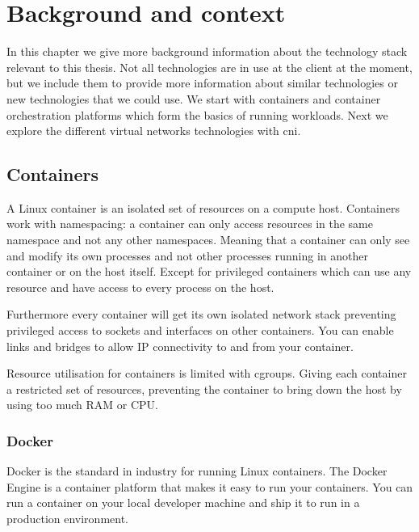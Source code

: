 \chapter{Background and context}
\label{chap:background}

In this chapter we give more background information about the technology stack relevant to this thesis. Not all technologies are in use at the client at the moment, but we include them to provide more information about similar technologies or new technologies that we could use. We start with containers and container orchestration platforms which form the basics of running workloads. Next we explore the different virtual networks technologies with \gls{cni}.

\section{Containers}
\label{sec:containers}
A Linux container is an isolated set of resources on a compute host. Containers work with namespacing: a container can only access resources in the same namespace and not any other namespaces. Meaning that a container can only see and modify its own processes and not other processes running in another container or on the host itself. Except for privileged containers which can use any resource and have access to every process on the host. 

Furthermore every container will get its own isolated network stack preventing privileged access to sockets and interfaces on other containers. You can enable links and bridges to allow IP connectivity to and from your container.

Resource utilisation for containers is limited with \glspl{cgroup}. Giving each container a restricted set of resources, preventing the container to bring down the host by using too much RAM or CPU\cite{docker_security}.

\subsection{Docker}
\label{subsec:docker}
Docker is the standard in industry for running Linux containers. The Docker Engine is a container platform that makes it easy to run your containers. You can run a container on your local developer machine and ship it to run in a production environment.

